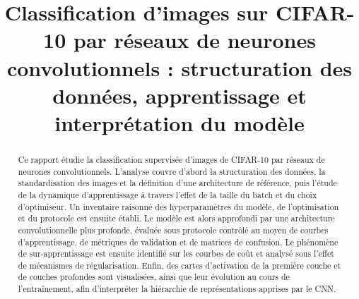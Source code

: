 \documentclass[conference]{IEEEtran}
\begin{document}
\title{Classification d'images sur CIFAR-10 par r\'eseaux de neurones convolutionnels : structuration des donn\'ees, apprentissage et interpr\'etation du mod\`ele}


\author{
    \and
    \and
}

\maketitle

\begin{abstract}
Ce rapport \'etudie la classification supervis\'ee d'images de CIFAR-10 par r\'eseaux de neurones convolutionnels. L'analyse couvre d'abord la structuration des donn\'ees, la standardisation des images et la d\'efinition d'une architecture de r\'ef\'erence, puis l'\'etude de la dynamique d'apprentissage \`a travers l'effet de la taille du batch et du choix d'optimiseur. Un inventaire raisonn\'e des hyperparam\`etres du mod\`ele, de l'optimisation et du protocole est ensuite \'etabli. Le mod\`ele est alors approfondi par une architecture convolutionnelle plus profonde, \'evalu\'ee sous protocole contr\^ol\'e au moyen de courbes d'apprentissage, de m\'etriques de validation et de matrices de confusion. Le ph\'enom\`ene de sur-apprentissage est ensuite identifi\'e sur les courbes de co\^ut et analys\'e sous l'effet de m\'ecanismes de r\'egularisation. Enfin, des cartes d'activation de la premi\`ere couche et de couches profondes sont visualis\'ees, ainsi que leur \'evolution au cours de l'entra\^inement, afin d'interpr\'eter la hi\'erarchie de repr\'esentations apprises par le CNN.
\end{abstract}
\end{document}
